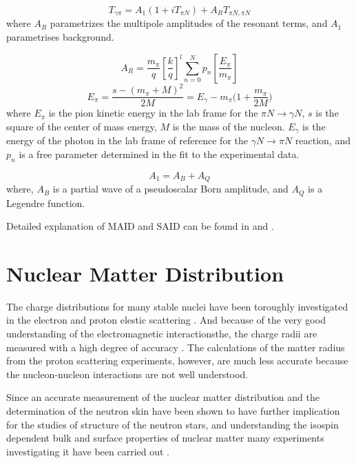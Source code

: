 \begin{equation}
T_{\gamma\pi}=A_{1}(1+iT_{\pi N})+A_{R}T_{\pi N,\pi N}
\end{equation}
where $A_{R}$ parametrizes the multipole amplitudes of the resonant terms, and $A_{1}$ parametrises background.

\begin{equation}
A_{R}=\frac{m_{\pi}}{q}\left[\frac{k}{q}\right]^{l}\sum\limits_{n=0}^{N}p_{n}\left[\frac{E_{\pi}}{m_{\pi}}\right]
\end{equation}
\begin{equation}
E_{\pi}=\frac{s-(m_{\pi}+M)^{2}}{2M}=E_{\gamma}-m_{\pi}\Big(1+\frac{m_{\pi}}{2M}\Big)
\end{equation}
where $E_{\pi}$ is the pion kinetic energy in the lab frame for the $\pi N\rightarrow \gamma N$, $s$ is the square of the center of mass energy, $M$ is the mass of the nucleon. $E_{\gamma}$ is the energy of the photon in the lab frame of reference for the $\gamma N \rightarrow \pi N$ reaction, and $p_{n}$ is a free parameter determined in the fit to the experimental data.

\begin{equation}
A_{1}=A_{B}+A_{Q}
\end{equation}
where, $A_{B}$ is a partial wave of a pseudoscalar Born amplitude, and $A_{Q}$ is a Legendre function.

\indent Detailed explanation of MAID and SAID can be found in \cite{maid,drechsel} and \cite{said, arndt}.

\section{Nuclear Matter Distribution}

\indent The charge distributions for many stable nuclei have been toroughly investigated in the electron and proton elestic scattering \cite{alkhazov, batty, igo}. And because of the very good understanding of the electromagnetic interactionsthe, the charge radii are measured with a high degree of accuracy \cite{devires, fricke}. The calculations of the matter radius from the proton scattering experiments, however, are much less accurate because the nucleon-nucleon interactions are not well understood.

\indent Since an accurate measurement of the nuclear matter distribution and the determination of the neutron skin have been shown to have further implication for the studies of structure of the neutron stars, and understanding the isospin dependent bulk and surface properties of nuclear matter \cite{iida} many experiments investigating it have been carried out \cite{neumaier, dobrovolsky, alkhazov2}.

